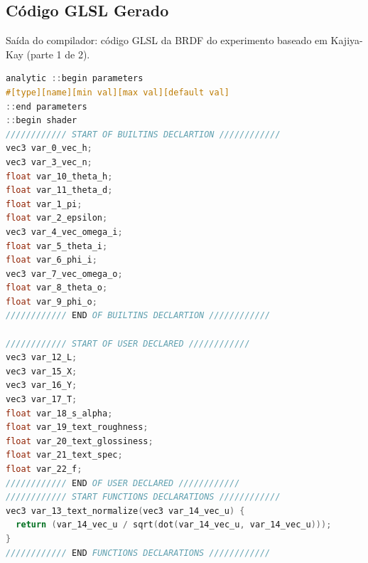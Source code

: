 \subsection{Código GLSL Gerado}
\begin{codigo}[H]
    \caption{\small Saída do compilador: código GLSL da BRDF do experimento baseado em Kajiya-Kay (parte 1 de 2).}
    \label{cod-kajiya-glsl-pt-1}
\begin{lstlisting}[language=C, inputencoding=utf8]
analytic ::begin parameters
#[type][name][min val][max val][default val]
::end parameters
::begin shader
//////////// START OF BUILTINS DECLARTION ////////////
vec3 var_0_vec_h;
vec3 var_3_vec_n;
float var_10_theta_h;
float var_11_theta_d;
float var_1_pi;
float var_2_epsilon;
vec3 var_4_vec_omega_i;
float var_5_theta_i;
float var_6_phi_i;
vec3 var_7_vec_omega_o;
float var_8_theta_o;
float var_9_phi_o;
//////////// END OF BUILTINS DECLARTION ////////////

//////////// START OF USER DECLARED ////////////
vec3 var_12_L;
vec3 var_15_X;
vec3 var_16_Y;
vec3 var_17_T;
float var_18_s_alpha;
float var_19_text_roughness;
float var_20_text_glossiness;
float var_21_text_spec;
float var_22_f;
//////////// END OF USER DECLARED ////////////
//////////// START FUNCTIONS DECLARATIONS ////////////
vec3 var_13_text_normalize(vec3 var_14_vec_u) {
  return (var_14_vec_u / sqrt(dot(var_14_vec_u, var_14_vec_u)));
}
//////////// END FUNCTIONS DECLARATIONS ////////////
\end{lstlisting}
\end{codigo}

